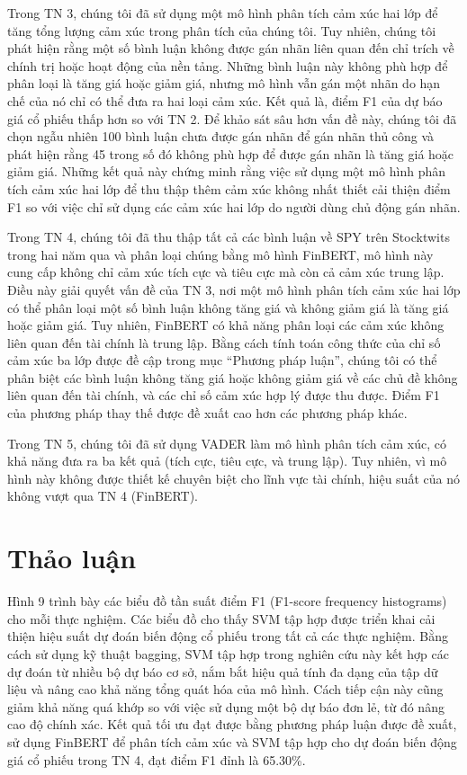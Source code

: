 Trong TN 3, chúng tôi đã sử dụng một mô hình phân tích cảm xúc hai lớp để tăng tổng lượng cảm xúc trong phân tích của chúng tôi. Tuy nhiên, chúng tôi phát hiện rằng một số bình luận không được gán nhãn liên quan đến chỉ trích về chính trị hoặc hoạt động của nền tảng. Những bình luận này không phù hợp để phân loại là tăng giá hoặc giảm giá, nhưng mô hình vẫn gán một nhãn do hạn chế của nó chỉ có thể đưa ra hai loại cảm xúc. Kết quả là, điểm F1 của dự báo giá cổ phiếu thấp hơn so với TN 2. Để khảo sát sâu hơn vấn đề này, chúng tôi đã chọn ngẫu nhiên 100 bình luận chưa được gán nhãn để gán nhãn thủ công và phát hiện rằng 45 trong số đó không phù hợp để được gán nhãn là tăng giá hoặc giảm giá. Những kết quả này chứng minh rằng việc sử dụng một mô hình phân tích cảm xúc hai lớp để thu thập thêm cảm xúc không nhất thiết cải thiện điểm F1 so với việc chỉ sử dụng các cảm xúc hai lớp do người dùng chủ động gán nhãn.

Trong TN 4, chúng tôi đã thu thập tất cả các bình luận về SPY trên Stocktwits trong hai năm qua và phân loại chúng bằng mô hình FinBERT, mô hình này cung cấp không chỉ cảm xúc tích cực và tiêu cực mà còn cả cảm xúc trung lập. Điều này giải quyết vấn đề của TN 3, nơi một mô hình phân tích cảm xúc hai lớp có thể phân loại một số bình luận không tăng giá và không giảm giá là tăng giá hoặc giảm giá. Tuy nhiên, FinBERT có khả năng phân loại các cảm xúc không liên quan đến tài chính là trung lập. Bằng cách tính toán công thức của chỉ số cảm xúc ba lớp được đề cập trong mục ``Phương pháp luận'', chúng tôi có thể phân biệt các bình luận không tăng giá hoặc không giảm giá về các chủ đề không liên quan đến tài chính, và các chỉ số cảm xúc hợp lý được thu được. Điểm F1 của phương pháp thay thế được đề xuất cao hơn các phương pháp khác.

Trong TN 5, chúng tôi đã sử dụng VADER làm mô hình phân tích cảm xúc, có khả năng đưa ra ba kết quả (tích cực, tiêu cực, và trung lập). Tuy nhiên, vì mô hình này không được thiết kế chuyên biệt cho lĩnh vực tài chính, hiệu suất của nó không vượt qua TN 4 (FinBERT).

\section{Thảo luận}

Hình 9 trình bày các biểu đồ tần suất điểm F1 (F1-score frequency histograms) cho mỗi thực nghiệm. Các biểu đồ cho thấy SVM tập hợp được triển khai cải thiện hiệu suất dự đoán biến động cổ phiếu trong tất cả các thực nghiệm. Bằng cách sử dụng kỹ thuật bagging, SVM tập hợp trong nghiên cứu này kết hợp các dự đoán từ nhiều bộ dự báo cơ sở, nắm bắt hiệu quả tính đa dạng của tập dữ liệu và nâng cao khả năng tổng quát hóa của mô hình. Cách tiếp cận này cũng giảm khả năng quá khớp so với việc sử dụng một bộ dự báo đơn lẻ, từ đó nâng cao độ chính xác. Kết quả tối ưu đạt được bằng phương pháp luận được đề xuất, sử dụng FinBERT để phân tích cảm xúc và SVM tập hợp cho dự đoán biến động giá cổ phiếu trong TN 4, đạt điểm F1 đỉnh là 65.30\%.

